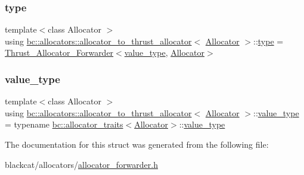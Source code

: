 \subsubsection{\texorpdfstring{type}{type}}
{\footnotesize\ttfamily template$<$class Allocator $>$ \\
using \hyperlink{structbc_1_1allocators_1_1allocator__to__thrust__allocator}{bc\+::allocators\+::allocator\+\_\+to\+\_\+thrust\+\_\+allocator}$<$ \hyperlink{classbc_1_1allocators_1_1Allocator}{Allocator} $>$\+::\hyperlink{structbc_1_1allocators_1_1allocator__to__thrust__allocator_a6825abb5bb34ca66088ca65b7dcd0ebc}{type} =  \hyperlink{structbc_1_1allocators_1_1Thrust__Allocator__Forwarder}{Thrust\+\_\+\+Allocator\+\_\+\+Forwarder}$<$\hyperlink{structbc_1_1allocators_1_1allocator__to__thrust__allocator_a3d6121959fbf5322c74a82a473d21492}{value\+\_\+type}, \hyperlink{classbc_1_1allocators_1_1Allocator}{Allocator}$>$}

\mbox{\label{structbc_1_1allocators_1_1allocator__to__thrust__allocator_a3d6121959fbf5322c74a82a473d21492}} 
\subsubsection{\texorpdfstring{value\+\_\+type}{value\_type}}
{\footnotesize\ttfamily template$<$class Allocator $>$ \\
using \hyperlink{structbc_1_1allocators_1_1allocator__to__thrust__allocator}{bc\+::allocators\+::allocator\+\_\+to\+\_\+thrust\+\_\+allocator}$<$ \hyperlink{classbc_1_1allocators_1_1Allocator}{Allocator} $>$\+::\hyperlink{structbc_1_1allocators_1_1allocator__to__thrust__allocator_a3d6121959fbf5322c74a82a473d21492}{value\+\_\+type} =  typename \hyperlink{structbc_1_1allocators_1_1allocator__traits}{bc\+::allocator\+\_\+traits}$<$\hyperlink{classbc_1_1allocators_1_1Allocator}{Allocator}$>$\+::\hyperlink{structbc_1_1allocators_1_1allocator__to__thrust__allocator_a3d6121959fbf5322c74a82a473d21492}{value\+\_\+type}}



The documentation for this struct was generated from the following file\+:\begin{DoxyCompactItemize}
\item 
blackcat/allocators/\hyperlink{allocator__forwarder_8h}{allocator\+\_\+forwarder.\+h}\end{DoxyCompactItemize}
